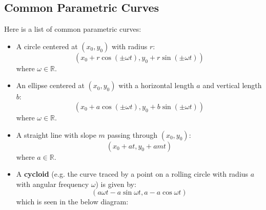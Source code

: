 \documentclass{article}
\begin{document}
    \subsection{Common Parametric Curves}
    Here is a list of common parametric curves:
    \begin{itemize}
        \item A circle centered at $(x_0,y_0)$ with radius $r$:
        \begin{equation}
            (x_0 + r\cos(\pm \omega t), y_0 + r\sin(\pm \omega t))
        \end{equation}
        where $\omega \in \mathbb{R}$.
        \item An ellipse centered at $(x_0,y_0)$ with a horizontal length $a$ and vertical length $b$:
        \begin{equation}
            (x_0 + a\cos(\pm \omega t), y_0+ b\sin(\pm \omega t))
        \end{equation}
        where $\omega \in \mathbb{R}$.
        \item A straight line with slope $m$ passing through $(x_0,y_0)$:
        \begin{equation}
            (x_0 + at, y_0 + amt)
        \end{equation}
        where $a \in \mathbb{R}$.
        \item A \textbf{cycloid} (e.g. the curve traced by a point on a rolling circle with radius $a$ with angular frequency $\omega$) is given by:
        \begin{equation}
            (a\omega t-a\sin \omega t, a-a\cos\omega t)
        \end{equation}
        which is seen in the below diagram:
        \begin{center}
\end{center}
\end{itemize}
\end{document}
